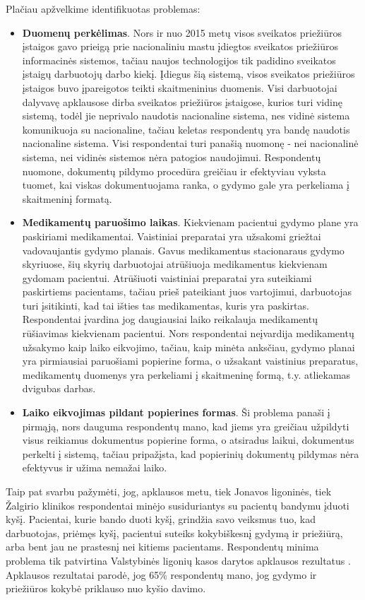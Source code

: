 Plačiau apžvelkime identifikuotas problemas:
\begin{itemize}
    \item \textbf{Duomenų perkėlimas}. Nors ir nuo 2015 metų visos sveikatos priežiūros įstaigos gavo prieigą prie nacionaliniu mastu įdiegtos sveikatos priežiūros informacinės sistemos, tačiau naujos technologijos tik padidino sveikatos įstaigų darbuotojų darbo kiekį. Įdiegus šią sistemą, visos sveikatos priežiūros įstaigos buvo įpareigotos teikti skaitmeninius duomenis. Visi darbuotojai dalyvavę apklausose dirba sveikatos priežiūros įstaigose, kurios turi vidinę sistemą, todėl jie neprivalo naudotis nacionaline sistema, nes vidinė sistema komunikuoja su nacionaline, tačiau keletas respondentų yra bandę naudotis nacionaline sistema. Visi respondentai turi panašią nuomonę - nei nacionalinė sistema, nei vidinės sistemos nėra patogios naudojimui. Respondentų nuomone, dokumentų pildymo procedūra greičiau ir efektyviau vyksta tuomet, kai viskas dokumentuojama ranka, o gydymo gale yra perkeliama į skaitmeninį formatą.
    \item \textbf{Medikamentų paruošimo laikas}. Kiekvienam pacientui gydymo plane yra paskiriami medikamentai. Vaistiniai preparatai yra užsakomi griežtai vadovaujantis gydymo planais. Gavus medikamentus stacionaraus gydymo skyriuose, šių skyrių darbuotojai atrūšiuoja medikamentus kiekvienam gydomam pacientui. Atrūšiuoti vaistiniai preparatai yra suteikiami paskirtiems pacientams, tačiau prieš pateikiant juos vartojimui, darbuotojas turi įsitikinti, kad tai išties tas medikamentas, kuris yra paskirtas. Respondentai įvardina jog daugiausiai laiko reikalauja medikamentų rūšiavimas kiekvienam pacientui. Nors respondentai neįvardija medikamentų užsakymo kaip laiko eikvojimo, tačiau, kaip minėta anksčiau, gydymo planai yra pirmiausiai paruošiami popierine forma, o užsakant vaistinius preparatus, medikamentų duomenys yra perkeliami į skaitmeninę formą, t.y. atliekamas dvigubas darbas.
    \item \textbf{Laiko eikvojimas pildant popierines formas}. Ši problema panaši į pirmąją, nors dauguma respondentų mano, kad jiems yra greičiau užpildyti visus reikiamus dokumentus popierine forma, o atsiradus laikui, dokumentus perkelti į sistemą, tačiau pripažįsta, kad popierinių dokumentų pildymas nėra efektyvus ir užima nemažai laiko.
\end{itemize}

Taip pat svarbu pažymėti, jog, apklausos metu, tiek Jonavos ligoninės, tiek Žalgirio klinikos respondentai minėjo susiduriantys su pacientų bandymu įduoti kyšį. Pacientai, kurie bando duoti kyšį, grindžia savo veiksmus tuo, kad darbuotojas, priėmęs kyšį, pacientui suteiks kokybiškesnį gydymą ir priežiūrą, arba bent jau ne prastesnį nei kitiems pacientams. Respondentų minima problema tik patvirtina Valstybinės ligonių kasos darytos apklausos rezultatus \cite{Kasa2016}. Apklausos rezultatai parodė, jog 65\% respondentų mano, jog gydymo ir priežiūros kokybė priklauso nuo kyšio davimo. 

